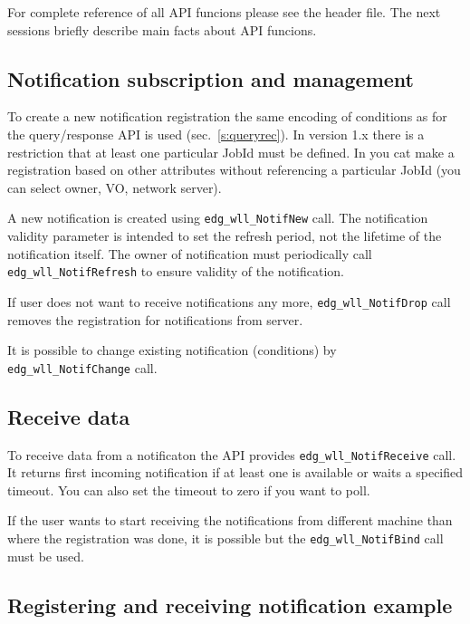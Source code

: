 For complete reference of all API funcions please see the header
file. The next sessions briefly describe main facts about API
funcions.

\subsection{Notification subscription and management}
To create a new notification registration the same encoding of
conditions as for the \LB query/response API is used
(sec.~\ref{s:queryrec}). In version 1.x there is a restriction that at
least one particular JobId must be defined. In  you cat make a
registration based on other attributes without referencing a
particular JobId (you can select owner, VO, network server).

A new notification is created using \lstinline'edg_wll_NotifNew' call. The
notification validity parameter is intended to set the refresh period,
not the lifetime of the notification itself. The owner of notification
must periodically call \lstinline'edg_wll_NotifRefresh' to ensure validity
of the notification.

If user does not want to receive notifications any more,
\lstinline'edg_wll_NotifDrop' call removes the registration for
notifications from \LB server.

It is possible to change existing notification (conditions) by
\lstinline'edg_wll_NotifChange' call.

\subsection{Receive data}
To receive data from a notificaton the API provides
\lstinline'edg_wll_NotifReceive' call. It returns first incoming
notification if at least one is available or waits a specified timeout. You can
also set the timeout to zero if you want to poll.

If the user wants to start receiving the notifications from different machine
than where the registration was done, it is possible but the
\verb'edg_wll_NotifBind' call must be used. 



\subsection{Registering and receiving notification example}

